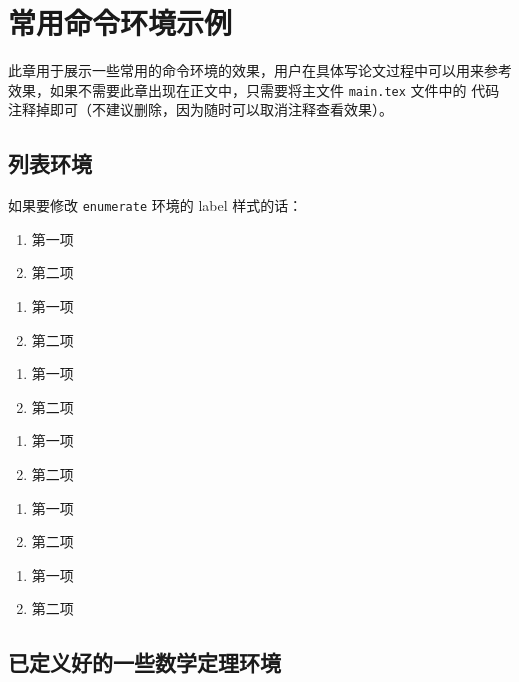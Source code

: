 \chapter{常用命令环境示例}

此章用于展示一些常用的命令环境的效果，用户在具体写论文过程中可以用来参考效果，如果不需要此章出现在正文中，只需要将主文件 \verb|main.tex| 文件中的 \verb|| 代码注释掉即可（不建议删除，因为随时可以取消注释查看效果）。


\section{列表环境}


如果要修改 \verb|enumerate| 环境的 label 样式的话：

\begin{enumerate}
  \item 第一项
  \item 第二项
\end{enumerate}

\begin{enumerate}[label = (\arabic*)]
  \item 第一项
  \item 第二项
\end{enumerate}

\begin{enumerate}[label = (\alph*)]
  \item 第一项
  \item 第二项
\end{enumerate}

\begin{enumerate}[label = (\Alph*)]
  \item 第一项
  \item 第二项
\end{enumerate}

\begin{enumerate}[label = \roman*.]
  \item 第一项
  \item 第二项
\end{enumerate}

\begin{enumerate}[label = \Roman*.]
  \item 第一项
  \item 第二项
\end{enumerate}



\section{已定义好的一些数学定理环境}

